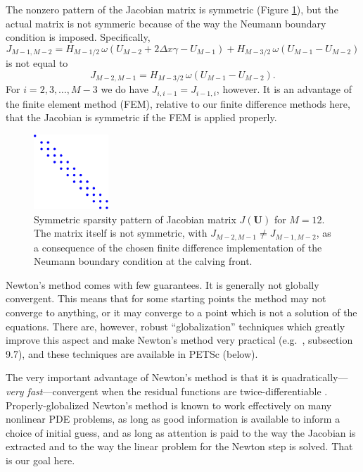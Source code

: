 \documentclass[11pt,final,reqno]{amsart}
\newcommand{\bU}{\mathbf{U}}
\begin{document}
The nonzero pattern of the Jacobian matrix is symmetric (Figure \ref{fig:spyJ}), but the actual matrix is not symmeric because of the way the Neumann boundary condition is imposed.  Specifically,
    $$J_{M-1,M-2} = H_{M-1/2}\, \omega(U_{M-2}+2\Delta x \gamma - U_{M-1}) + H_{M-3/2}\, \omega(U_{M-1}-U_{M-2})$$
is not equal to
    $$J_{M-2,M-1} = H_{M-3/2}\, \omega(U_{M-1}-U_{M-2}).$$
For $i=2,3,\dots,M-3$ we do have $J_{i,i-1} = J_{i-1,i}$, however.  It is an advantage of the finite element method (FEM), relative to our finite difference methods here, that the Jacobian is symmetric if the FEM is applied properly.

\begin{figure}[ht] 
\begin{center}
\includegraphics[width=0.25\textwidth]{spyJ}
\end{center}
\caption{Symmetric sparsity pattern of Jacobian matrix $J(\bU)$ for $M=12$.  The matrix itself is not symmetric, with $J_{M-2,M-1} \ne J_{M-1,M-2}$, as a consequence of the chosen finite difference implementation of the Neumann boundary condition at the calving front.}
\label{fig:spyJ}
\end{figure}

Newton's method comes with few guarantees.  It is generally not globally convergent.  This means that for some starting points the method may not converge to anything, or it may converge to a point which is not a solution of the equations.  There are, however, robust ``globalization'' techniques which greatly improve this aspect and make Newton's method very practical (e.g.~\cite{Pressetal}, subsection 9.7), and these techniques are available in PETSc (below).  

The very important advantage of Newton's method is that it is quadratically---\emph{very fast}---convergent when the residual functions are twice-differentiable \cite{BurdenFaires}.  Properly-globalized Newton's method is known to work effectively on many nonlinear PDE problems, as long as good information is available to inform a choice of initial guess, and as long as attention is paid to the way the Jacobian is extracted and to the way the linear problem for the Newton step is solved.  That is our goal here.
\end{document}
